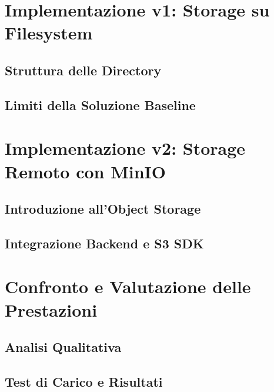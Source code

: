 \documentclass[12pt,a4paper]{report}
\begin{document}
\chapter{Implementazione v1: Storage su Filesystem}
\label{cap:v1_filesystem}

\section{Struttura delle Directory}

\section{Limiti della Soluzione Baseline}

\chapter{Implementazione v2: Storage Remoto con MinIO}
\label{cap:v2_minio}

\section{Introduzione all'Object Storage}

\section{Integrazione Backend e S3 SDK}

\chapter{Confronto e Valutazione delle Prestazioni}
\label{cap:confronto}

\section{Analisi Qualitativa}

\section{Test di Carico e Risultati}
\end{document}
